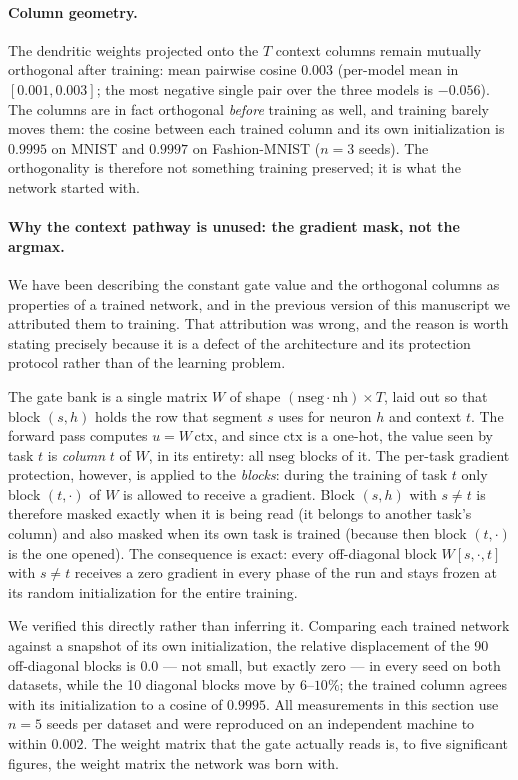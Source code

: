 \documentclass[10pt]{article}
\begin{document}
\paragraph{Column geometry.} The dendritic weights projected onto the
$T$ context columns remain mutually orthogonal after training: mean
pairwise cosine $0.003$ (per-model mean in $[0.001, 0.003]$; the most
negative single pair over the three models is $-0.056$). The columns are
in fact orthogonal \emph{before} training as well, and training barely
moves them: the cosine between each trained column and its own
initialization is $0.9995$ on MNIST and $0.9997$ on Fashion-MNIST
($n=3$ seeds). The orthogonality is therefore not something training
preserved; it is what the network started with.

\paragraph{Why the context pathway is unused: the gradient mask, not the
argmax.} We have been describing the constant gate value and the
orthogonal columns as properties of a trained network, and in the
previous version of this manuscript we attributed them to training. That
attribution was wrong, and the reason is worth stating precisely because
it is a defect of the architecture and its protection protocol rather
than of the learning problem.

The gate bank is a single matrix $W$ of shape
$(\text{nseg}\cdot\text{nh}) \times T$, laid out so that block
$(s, h)$ holds the row that segment $s$ uses for neuron $h$ and context
$t$. The forward pass computes $u = W\,\mathrm{ctx}$, and since
$\mathrm{ctx}$ is a one-hot, the value seen by task $t$ is
\emph{column} $t$ of $W$, in its entirety: all $\text{nseg}$ blocks of
it. The per-task gradient protection, however, is applied to the
\emph{blocks}: during the training of task $t$ only block $(t, \cdot)$ of
$W$ is allowed to receive a gradient. Block $(s, h)$ with $s \ne t$ is
therefore masked exactly when it is being read (it belongs to another
task's column) and also masked when its own task is trained (because
then block $(t,\cdot)$ is the one opened). The consequence is exact:
every off-diagonal block $W[s, \cdot, t]$ with $s \ne t$ receives a zero
gradient in every phase of the run and stays frozen at its random
initialization for the entire training.

We verified this directly rather than inferring it. Comparing each
trained network against a snapshot of its own initialization, the
relative displacement of the 90 off-diagonal blocks is
$0.0$ --- not small, but exactly zero --- in every seed on both
datasets, while the 10 diagonal blocks move by $6$--$10\%$; the trained
column agrees with its initialization to a cosine of $0.9995$. All
measurements in this section use $n=5$ seeds per dataset and were
reproduced on an independent machine to within $0.002$. The
weight matrix that the gate actually reads is, to five significant
figures, the weight matrix the network was born with.
\end{document}
